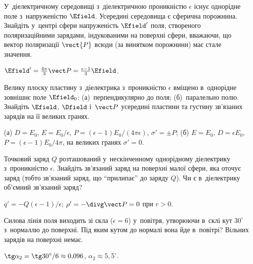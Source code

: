 \begin{problem}\label{prb:hole_in_dielectric}
	У~діелектричному середовищі з~діелектричною проникністю $\epsilon$ існує однорідне поле
	з~напруженістю $\Efield$. Усередині середовища є сферична порожнина. Знайдіть
	у~центрі сфери напруженість $\Efield'$ поля, створеного поляризаційними зарядами,
	індукованими на поверхні сфери, вважаючи, що вектор поляризації $\vect{P}$ всюди (за
	винятком порожнини) має стале значення.
	\begin{solution}
		$\Efield' = \frac{4\pi}{3}\vect P = \frac{\epsilon - 1}{3}\Efield$.
	\end{solution}
\end{problem}

\begin{problem}\label{prb:DielectricSlab}
	Велику плоску пластину з~діелектрика з~проникністю $\epsilon$ вміщено в~однорідне
	зовнішнє поле $\Efield_0$: (а)~перпендикулярно до поля; (б)~паралельно полю. Знайдіть
	$\Efield$, $\Dfield$ і~$\vect P$ усередині пластини та густину зв'язаних зарядів на її
	великих гранях.
	\begin{solution}
		(а) $D = E_0$, $E = E_0/\epsilon$, $P = (\epsilon-1)E_0/(4\pi\epsilon)$, $\sigma' = \pm P$;
		(б) $E = E_0$, $D = \epsilon E_0$, $P = (\epsilon-1)E_0/4\pi$, на великих гранях $\sigma' = 0$.
	\end{solution}
\end{problem}

\begin{problem}\label{prb:BoundAroundQ}
	Точковий заряд $Q$ розташований у~нескінченному однорідному діелектрику з~проникністю
	$\epsilon$. Знайдіть зв'язаний заряд на поверхні малої сфери, яка оточує заряд
	(тобто зв'язаний заряд, що \enquote{прилипає} до заряду $Q$). Чи є в~діелектрику
	об'ємний зв'язаний заряд?
	\begin{solution}
		$q' = -Q(\epsilon-1)/\epsilon$; $\rho' = -\divg\vect P = 0$ при $r > 0$.
	\end{solution}
\end{problem}

\begin{problem}
	Силова лінія поля виходить зі скла ($\epsilon = 6$) у~повітря, утворюючи в~склі кут
	$30^\circ$ з~нормаллю до поверхні. Під яким кутом до нормалі вона йде в~повітрі? Вільних
	зарядів на поверхні немає.
	\begin{solution}
		$\tg\alpha_2 = \tg 30^\circ/6 \approx 0{,}096$, $\alpha_2 \approx 5{,}5^\circ$.
	\end{solution}
\end{problem}

